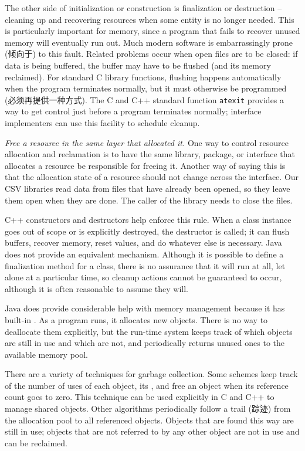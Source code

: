 The other side of initialization or construction is finalization or
destruction -- cleaning up and recovering resources when some entity is no
longer needed.  This is particularly important for memory, since a program
that fails to recover unused memory will eventually run out. Much modern
software is embarrassingly prone (倾向于) to this fault. Related problems
occur when open files are to be closed: if data is being buffered, the
buffer may have to be flushed (and its memory reclaimed). For standard C
library functions, flushing happens automatically when the program
terminates normally, but it must otherwise be programmed
(必须再提供一种方式). The C and C++ standard function \verb'atexit'
provides a way to get control just before a program terminates normally;
interface implementers can use this facility to schedule cleanup.

\emph{Free a resource in the same layer that allocated it.} One way to
control resource allocation and reclamation is to have the same library,
package, or interface that allocates a resource be responsible for freeing
it. Another way of saying this is that the allocation state of a resource
should not change across the interface. Our CSV libraries read data from
files that have already been opened, so they leave them open when they are
done. The caller of the library needs to close the files.

C++ constructors and destructors help enforce this rule. When a class
instance goes out of scope or is explicitly destroyed, the destructor is
called; it can flush buffers, recover memory, reset values, and do whatever
else is necessary.  Java does not provide an equivalent mechanism. Although
it is possible to define a finalization method for a class, there is no
assurance that it will run at all, let alone at a particular time, so
cleanup actions cannot be guaranteed to occur, although it is often
reasonable to assume they will.

Java does provide considerable help with memory management because it has
built-in . As a program runs, it allocates new
objects.  There is no way to deallocate them explicitly, but the run-time
system keeps track of which objects are still in use and which are not, and
periodically returns unused ones to the available memory pool.

There are a variety of techniques for garbage collection. Some schemes keep
track of the number of uses of each object, its , and
free an object when its reference count goes to zero. This technique can be
used explicitly in C and C++ to manage shared objects. Other algorithms
periodically follow a trail (踪迹) from the allocation pool to all
referenced objects. Objects that are found this way are still in use;
objects that are not referred to by any other object are not in use and can
be reclaimed.

